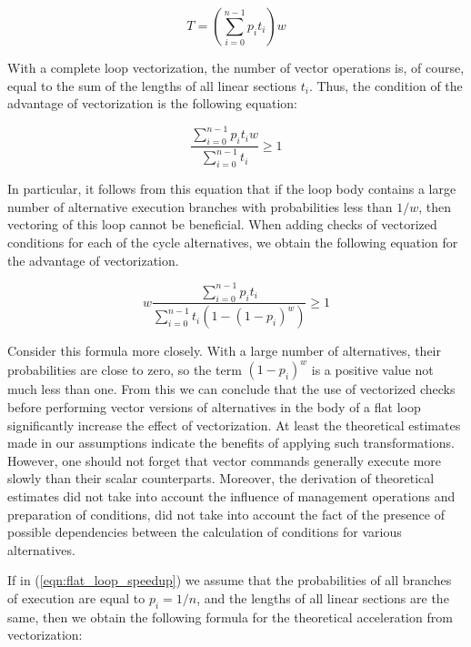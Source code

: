 \documentclass[
11pt,%
tightenlines,%
twoside,%
onecolumn,%
nofloats,%
nobibnotes,%
nofootinbib,%
superscriptaddress,%
noshowpacs,%
centertags]%
{revtex4}
\begin{document}
\begin{equation}
T = \left( \sum_{i = 0}^{n - 1}{p_it_i} \right) w
\end{equation}

With a complete loop vectorization, the number of vector operations is, of course, equal to the sum of the lengths of all linear sections $t_i$.
Thus, the condition of the advantage of vectorization is the following equation:

\begin{equation}
\frac{\sum_{i = 0}^{n - 1}{p_it_iw}}{\sum_{i = 0}^{n - 1}{t_i}} \ge 1
\end{equation}

In particular, it follows from this equation that if the loop body contains a large number of alternative execution branches with probabilities less than $1 / w$, then vectoring of this loop cannot be beneficial.
When adding checks of vectorized conditions for each of the cycle alternatives, we obtain the following equation for the advantage of vectorization.

\begin{equation}
\label{eqn:flat_loop_speedup}
w\frac{\sum_{i = 0}^{n - 1}{p_it_i}}{\sum_{i = 0}^{n - 1}{t_i(1 - (1 - p_i)^w)}} \ge 1
\end{equation}

Consider this formula more closely.
With a large number of alternatives, their probabilities are close to zero, so the term $(1 - p_i) ^ w$ is a positive value not much less than one.
From this we can conclude that the use of vectorized checks before performing vector versions of alternatives in the body of a flat loop significantly increase the effect of vectorization.
At least the theoretical estimates made in our assumptions indicate the benefits of applying such transformations.
However, one should not forget that vector commands generally execute more slowly than their scalar counterparts.
Moreover, the derivation of theoretical estimates did not take into account the influence of management operations and preparation of conditions, did not take into account the fact of the presence of possible dependencies between the calculation of conditions for various alternatives.

If in (\ref{eqn:flat_loop_speedup}) we assume that the probabilities of all branches of execution are equal to $p_i = 1 / n$, and the lengths of all linear sections are the same, then we obtain the following formula for the theoretical acceleration from vectorization:
\end{document}
